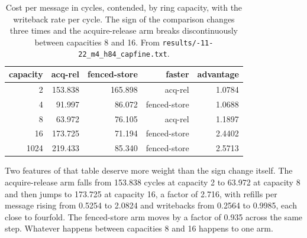 \documentclass[conference]{IEEEtran}
\begin{document}
\begin{table}[t]
\centering
\caption{Cost per message in cycles, contended, by ring capacity, with the
writeback rate per cycle. The sign of the comparison changes three times and
the acquire-release arm breaks discontinuously between capacities 8 and 16.
From \texttt{results/-11-22\_\allowbreak m4\_\allowbreak h84\_\allowbreak capfine.txt}.}
\label{tab:cap}
\begin{tabular}{rrrrr}
\hline
capacity & acq-rel & fenced-store & faster & advantage \\
\hline
2 & 153.838 & 165.898 & acq-rel & 1.0784 \\
4 & 91.997 & 86.072 & fenced-store & 1.0688 \\
8 & 63.972 & 76.105 & acq-rel & 1.1897 \\
16 & 173.725 & 71.194 & fenced-store & 2.4402 \\
1024 & 219.433 & 85.340 & fenced-store & 2.5713 \\
\hline
\end{tabular}
\end{table}

Two features of that table deserve more weight than the sign change itself. The
acquire-release arm falls from 153.838 cycles at capacity 2 to 63.972 at
capacity 8 and then jumps to 173.725 at capacity 16, a factor of 2.716, with
refills per message rising from 0.5254 to 2.0824 and writebacks from 0.2564 to
0.9985, each close to fourfold. The fenced-store arm moves by a factor of 0.935
across the same step. Whatever happens between capacities 8 and 16 happens to
one arm.
\end{document}
